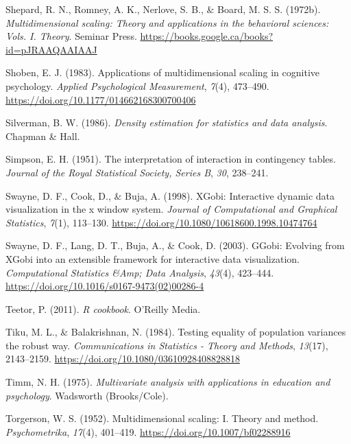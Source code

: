 \documentclass[
  letterpaper,
  10pt,
  krantz2]{krantz}
\newlength{\cslhangindent}
\newenvironment{CSLReferences}[2] %
 {\begin{list}{}{%
  \setlength{\itemindent}{0pt}
  \setlength{\leftmargin}{0pt}
  \setlength{\parsep}{0pt}
  \ifodd #1
   \setlength{\leftmargin}{\cslhangindent}
   \setlength{\itemindent}{-1\cslhangindent}
  \fi
  \setlength{\itemsep}{#2\baselineskip}}}
 {\end{list}}
\begin{document}
\begin{CSLReferences}{1}{0}
Shepard, R. N., Romney, A. K., Nerlove, S. B., \& Board, M. S. S.
(1972b). \emph{Multidimensional scaling: Theory and applications in the
behavioral sciences: Vols. I. Theory}. Seminar Press.
\url{https://books.google.ca/books?id=pJRAAQAAIAAJ}

Shoben, E. J. (1983). Applications of multidimensional scaling in
cognitive psychology. \emph{Applied Psychological Measurement},
\emph{7}(4), 473--490. \url{https://doi.org/10.1177/014662168300700406}

Silverman, B. W. (1986). \emph{Density estimation for statistics and
data analysis}. Chapman \& Hall.

Simpson, E. H. (1951). The interpretation of interaction in contingency
tables. \emph{Journal of the Royal Statistical Society, Series B},
\emph{30}, 238--241.

Swayne, D. F., Cook, D., \& Buja, A. (1998). XGobi: Interactive dynamic
data visualization in the x window system. \emph{Journal of
Computational and Graphical Statistics}, \emph{7}(1), 113--130.
\url{https://doi.org/10.1080/10618600.1998.10474764}

Swayne, D. F., Lang, D. T., Buja, A., \& Cook, D. (2003). {GGobi}:
Evolving from {XGobi} into an extensible framework for interactive data
visualization. \emph{Computational Statistics \&Amp; Data Analysis},
\emph{43}(4), 423--444.
\url{https://doi.org/10.1016/s0167-9473(02)00286-4}

Teetor, P. (2011). \emph{{R cookbook}}. {O'Reilly} Media.

Tiku, M. L., \& Balakrishnan, N. (1984). Testing equality of population
variances the robust way. \emph{Communications in Statistics - Theory
and Methods}, \emph{13}(17), 2143--2159.
\url{https://doi.org/10.1080/03610928408828818}

Timm, N. H. (1975). \emph{Multivariate analysis with applications in
education and psychology}. Wadsworth (Brooks/Cole).

Torgerson, W. S. (1952). Multidimensional scaling: I. Theory and method.
\emph{Psychometrika}, \emph{17}(4), 401--419.
\url{https://doi.org/10.1007/bf02288916}


\end{CSLReferences}
\end{document}

